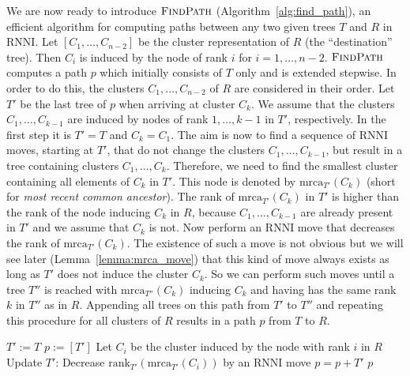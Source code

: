 \documentclass{amsart}
\newcommand{\mrca}{\mathrm{mrca}}
\newcommand{\rank}{\mathrm{rank}}
\newcommand{\rnni}{\mathrm{RNNI}}
\newcommand{\findpath}{\textsc{FindPath}}
\begin{document}
We are now ready to introduce $\findpath$ (Algorithm~\ref{alg:find_path}), an efficient algorithm for computing paths between any two given trees $T$ and $R$ in $\rnni$.
Let $[C_1, \ldots, C_{n-2}]$ be the cluster representation of $R$ (the ``destination'' tree).
Then $C_i$ is induced by the node of rank $i$ for $i = 1, \ldots, n-2$.
$\findpath$ computes a path $p$ which initially consists of $T$ only and is extended stepwise.
In order to do this, the clusters $C_1, \ldots, C_{n-2}$ of $R$ are considered in their order.
Let $T'$ be the last tree of $p$ when
arriving at cluster $C_k$.
We assume that the clusters $C_1, \ldots, C_{k-1}$ are induced by nodes of rank $1, \ldots, k-1$ in $T'$, respectively.
In the first step it is $T' = T$ and $C_k = C_1$.
The aim is now to find a sequence of $\rnni$ moves, starting at $T'$, that do not change the clusters $C_1, \ldots, C_{k-1}$, but result in a tree containing clusters $C_1, \ldots, C_{k}$.
Therefore, we need to find the smallest cluster containing all elements of $C_k$ in $T'$.
This node is denoted by $\mrca_{T'}(C_k)$ (short for \emph{most recent common ancestor}).
The rank of $\mrca_{T'}(C_k)$ in $T'$ is higher than the rank of the node inducing $C_k$ in $R$, because $C_1, \ldots, C_{k-1}$ are already present in $T'$ and we assume that $C_k$ is not.
Now perform an $\rnni$ move that decreases the rank of $\mrca_{T'}(C_k)$.
The existence of such a move is not obvious but we will see later (Lemma~\ref{lemma:mrca_move}) that this kind of move always exists as long as $T'$ does not induce the cluster $C_k$.
So we can perform such moves until a tree $T''$ is reached with $\mrca_{T''}(C_k)$ inducing $C_k$ and having has the same rank $k$ in $T''$ as in $R$.
Appending all trees on this path from $T'$ to $T''$ and repeating this procedure for all clusters of $R$ results in a path $p$ from $T$ to $R$.

\begin{algorithm}[H]
\caption{$\findpath$($T,R$)}
\label{alg:find_path}
\begin{algorithmic}[1]
\STATE $T' := T$
\STATE $p := [T']$
\STATE Let $C_i$ be the cluster induced by the node with rank $i$ in $R$ \label{alg:find_path:line:cluster}
\WHILE {$\rank_{T'}(\mrca_{T'}(C_i))>i$}
\STATE Update $T'$: Decrease $\rank_{T'}(\mrca_{T'}(C_i))$ by an $\rnni$ move \label{alg:findpath:line:move_set_down}
\STATE $p = p+T'$
\ENDWHILE
\ENDFOR
\RETURN $p$
\end{algorithmic}
\end{algorithm}
\end{document}
